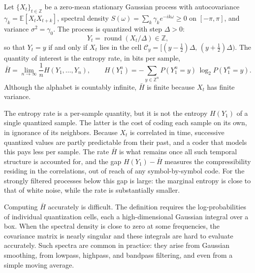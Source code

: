 \documentclass[11pt]{article}
\begin{document}
Let \(\{X_t\}_{t\in\mathbb Z}\) be a zero-mean stationary Gaussian process with autocovariance \(\gamma_k = \mathbb E[X_t X_{t+k}]\), spectral density \(S(\omega) = \sum_k \gamma_k e^{-ik\omega} \ge 0\) on \([-\pi,\pi]\), and variance \(\sigma^2 = \gamma_0\). The process is quantized with step \(\Delta > 0\):
\[Y_t = \operatorname{round}(X_t/\Delta) \in \mathbb Z,\]
so that \(Y_t = y\) if and only if \(X_t\) lies in the cell \(\mathcal C_y = [(y-\tfrac12)\Delta,\,(y+\tfrac12)\Delta)\). The quantity of interest is the entropy rate, in bits per sample,
\[\bar H = \lim_{n\to\infty}\frac1n H(Y_1,\dots,Y_n), \qquad H(Y_1^n) = -\sum_{y\in\mathbb Z^n} P(Y_1^n = y)\,\log_2 P(Y_1^n = y).\]
Although the alphabet is countably infinite, \(\bar H\) is finite because \(X_t\) has finite variance.

The entropy rate is a per-sample quantity, but it is not the entropy \(H(Y_1)\) of a single quantized sample. The latter is the cost of coding each sample on its own, in ignorance of its neighbors. Because \(X_t\) is correlated in time, successive quantized values are partly predictable from their past, and a coder that models this pays less per sample. The rate \(\bar H\) is what remains once all such temporal structure is accounted for, and the gap \(H(Y_1) - \bar H\) measures the compressibility residing in the correlations, out of reach of any symbol-by-symbol code. For the strongly filtered processes below this gap is large: the marginal entropy is close to that of white noise, while the rate is substantially smaller.

Computing \(\bar H\) accurately is difficult. The definition requires the log-probabilities of individual quantization cells, each a high-dimensional Gaussian integral over a box. When the spectral density is close to zero at some frequencies, the covariance matrix is nearly singular and these integrals are hard to evaluate accurately. Such spectra are common in practice: they arise from Gaussian smoothing, from lowpass, highpass, and bandpass filtering, and even from a simple moving average.
\end{document}
